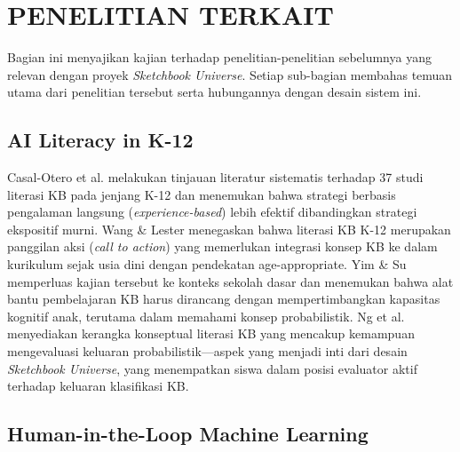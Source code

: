 \documentclass[12pt,a4paper,oneside,openany]{report}
\begin{document}
\section{PENELITIAN TERKAIT}
\label{sec:penelitian-terkait}

Bagian ini menyajikan kajian terhadap penelitian-penelitian sebelumnya yang relevan dengan proyek \textit{Sketchbook Universe}. Setiap sub-bagian membahas temuan utama dari penelitian tersebut serta hubungannya dengan desain sistem ini.

\subsection{AI Literacy in K-12}
\label{subsec:penelitian-ai-literacy-k12}

Casal-Otero et al. \cite{ref2} melakukan tinjauan literatur sistematis terhadap 37 studi literasi KB pada jenjang K-12 dan menemukan bahwa strategi berbasis pengalaman langsung (\textit{experience-based}) lebih efektif dibandingkan strategi ekspositif murni. Wang \& Lester \cite{ref11} menegaskan bahwa literasi KB K-12 merupakan panggilan aksi (\textit{call to action}) yang memerlukan integrasi konsep KB ke dalam kurikulum sejak usia dini dengan pendekatan age-appropriate. Yim \& Su \cite{ref12} memperluas kajian tersebut ke konteks sekolah dasar dan menemukan bahwa alat bantu pembelajaran KB harus dirancang dengan mempertimbangkan kapasitas kognitif anak, terutama dalam memahami konsep probabilistik. Ng et al. \cite{ref1} menyediakan kerangka konseptual literasi KB yang mencakup kemampuan mengevaluasi keluaran probabilistik---aspek yang menjadi inti dari desain \textit{Sketchbook Universe}, yang menempatkan siswa dalam posisi evaluator aktif terhadap keluaran klasifikasi KB.

\subsection{Human-in-the-Loop Machine Learning}
\label{subsec:penelitian-hitl-ml}
\end{document}
